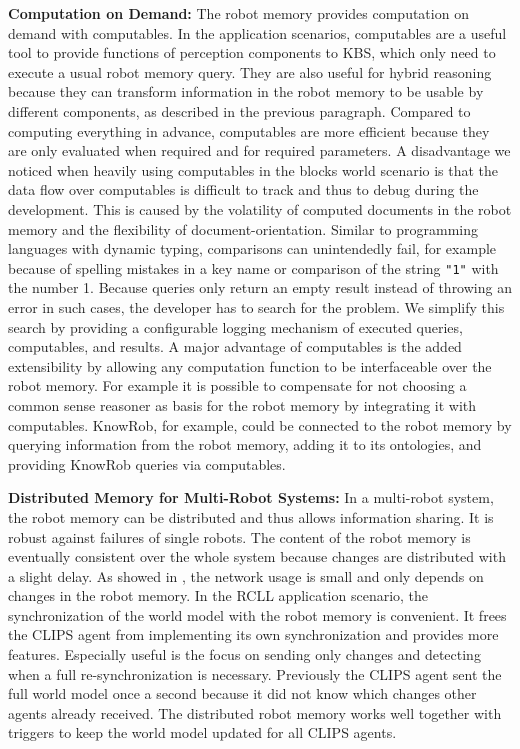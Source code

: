 \textbf{Computation on Demand:}
The robot memory provides computation on demand with computables. In
the application scenarios, computables are a useful tool to provide
functions of perception components to KBS, which only need to execute
a usual robot memory query. They are also useful for hybrid reasoning
because they can transform information in the robot memory to be
usable by different components, as described in the previous
paragraph. Compared
to computing everything in advance, computables are more efficient because
they are only evaluated when required and for required parameters.
A disadvantage we noticed when heavily using computables in the blocks
world scenario is that the data flow over computables is difficult to
track and thus to debug during the development. This is caused by the
volatility of computed documents in the robot memory and the
flexibility of document-orientation. Similar to programming
languages with dynamic typing, comparisons can unintendedly fail, for
example because of spelling mistakes in a key name or comparison
of the string \texttt{"1"} with the number 1. Because queries
only return an empty result instead of throwing an error in such
cases, the developer has to search for the problem. We
simplify this search by providing a configurable logging mechanism of
executed queries, computables, and results.
A major advantage of computables is the added extensibility by
allowing any computation function to be interfaceable over the robot
memory. For example it is possible to compensate for not choosing a
common sense reasoner as basis for the robot memory by integrating it
with computables. KnowRob, for example, could be connected to the
robot memory by querying information from the robot memory, adding it
to its ontologies, and providing KnowRob queries via computables.

\textbf{Distributed Memory for Multi-Robot Systems:} 
In a multi-robot system, the robot memory can be distributed and thus
allows information sharing. It is robust against failures of single
robots. The content of the robot memory is
eventually consistent over the whole system because changes are
distributed with a slight delay.  As showed in , the network
usage is small and only depends on changes in the robot memory. In the
RCLL application scenario, the synchronization of the world model with
the robot memory is convenient. It frees the CLIPS agent from
implementing its own synchronization and provides more
features. Especially useful is the focus on sending only changes and
detecting when a full re-synchronization is necessary. Previously the
CLIPS agent sent the full world model once a second because it did not
know which changes other agents already received. The distributed
robot memory works well together with triggers to keep the world model
updated for all CLIPS agents.

